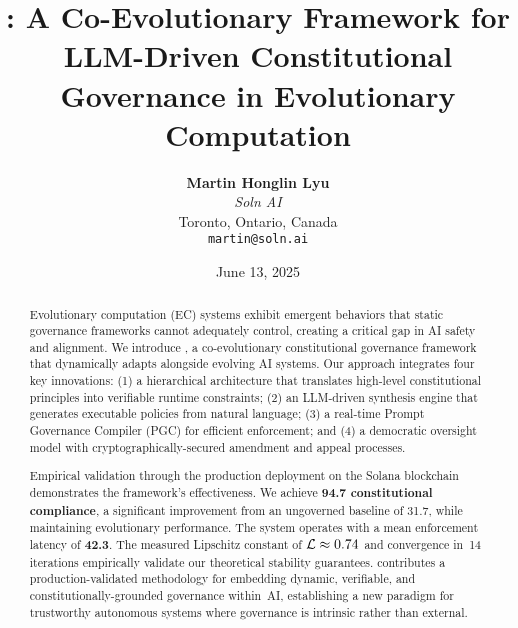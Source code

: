 




\title{\textbf{\acgs{}: A Co-Evolutionary Framework for LLM-Driven Constitutional Governance in Evolutionary Computation}}

\author{
    \textbf{Martin Honglin Lyu}\\
    \textit{Soln AI}\\
    Toronto, Ontario, Canada\\
    \texttt{martin@soln.ai}
}

\date{June 13, 2025}

\maketitle

\begin{abstract}
Evolutionary computation (EC) systems exhibit emergent behaviors that static governance frameworks cannot adequately control, creating a critical gap in AI safety and alignment. We introduce \acgs{}, a co-evolutionary constitutional governance framework that dynamically adapts alongside evolving AI systems. Our approach integrates four key innovations: (1) a hierarchical architecture that translates high-level constitutional principles into verifiable runtime constraints; (2) an LLM-driven synthesis engine that generates executable policies from natural language; (3) a real-time Prompt Governance Compiler (PGC) for efficient enforcement; and (4) a democratic oversight model with cryptographically-secured amendment and appeal processes.

Empirical validation through the \quantumagi{} production deployment on the Solana blockchain demonstrates the framework's effectiveness. We achieve \textbf{94.7\percent{} constitutional compliance}, a significant improvement from an ungoverned baseline of 31.7\percent{}, while maintaining evolutionary performance. The system operates with a mean enforcement latency of \textbf{42.3\ms{}}. The measured Lipschitz constant of $\lipschitz \approx 0.74$ and convergence in~14 iterations empirically validate our theoretical stability guarantees. \acgs{} contributes a production-validated methodology for embedding dynamic, verifiable, and constitutionally-grounded governance within~AI, establishing a new paradigm for trustworthy autonomous systems where governance is intrinsic rather than external.
\end{abstract}

